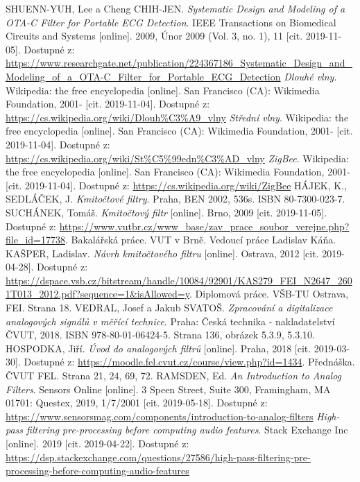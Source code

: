\newpage
\begin{thebibliography}{999}
SHUENN-YUH, Lee a Cheng CHIH-JEN. \textit{Systematic Design and Modeling of a OTA-C Filter for Portable ECG Detection}. IEEE Transactions on Biomedical Circuits and Systems [online]. 2009, Únor 2009 (Vol. 3, no. 1), 11 [cit. 2019-11-05]. Dostupné z: \url{https://www.researchgate.net/publication/224367186_Systematic_Design_and_Modeling_of_a_OTA-C_Filter_for_Portable_ECG_Detection}
\textit{Dlouhé vlny}. Wikipedia: the free encyclopedia [online]. San Francisco (CA): Wikimedia Foundation, 2001- [cit. 2019-11-04]. Dostupné z: \url{https://cs.wikipedia.org/wiki/Dlouh%C3%A9_vlny}
\textit{Střední vlny}. Wikipedia: the free encyclopedia [online]. San Francisco (CA): Wikimedia Foundation, 2001- [cit. 2019-11-04]. Dostupné z: \url{https://cs.wikipedia.org/wiki/St%C5%99edn%C3%AD_vlny}
\textit{ZigBee}. Wikipedia: the free encyclopedia [online]. San Francisco (CA): Wikimedia Foundation, 2001- [cit. 2019-11-04]. Dostupné z: \url{https://cs.wikipedia.org/wiki/ZigBee}
HÁJEK, K., SEDLÁČEK, J. \textit{Kmitočtové  filtry}. Praha, BEN 2002, 536s. ISBN 80-7300-023-7.
SUCHÁNEK, Tomáš. \textit{Kmitočtový filtr} [online]. Brno, 2009 [cit. 2019-11-05]. Dostupné z: \url{https://www.vutbr.cz/www_base/zav_prace_soubor_verejne.php?file_id=17738}. Bakalářská práce. VUT v Brně. Vedoucí práce Ladislav Káňa.
KAŠPER, Ladislav. \textit{Návrh kmitočtového filtru} [online]. Ostrava, 2012 [cit. 2019-04-28]. Dostupné z: \url{https://dspace.vsb.cz/bitstream/handle/10084/92901/KAS279_FEI_N2647_2601T013_2012.pdf?sequence=1&isAllowed=y}. Diplomová práce. VŠB-TU Ostrava, FEI. Strana 18.
VEDRAL, Josef a Jakub SVATOŠ. \textit{Zpracování a digitalizace analogových signálů v měřící technice}. Praha: Česká technika - nakladatelství ČVUT, 2018. ISBN 978-80-01-06424-5. Strana 136, obrázek 5.3.9, 5.3.10.
HOSPODKA, Jiří. \textit{Úvod do analogových filtrů} [online]. Praha, 2018 [cit. 2019-03-30]. Dostupné z: \url{https://moodle.fel.cvut.cz/course/view.php?id=1434}. Přednáška. ČVUT FEL. Strana 21, 24, 69, 72.
\renewcommand{\headrulewidth}{0pt}
\fancyhf{}
RAMSDEN, Ed. \textit{An Introduction to Analog Filters}. Sensors Online [online]. 3 Speen Street, Suite 300, Framingham, MA 01701: Questex, 2019, 1/7/2001 [cit. 2019-05-18]. Dostupné z: \url{https://www.sensorsmag.com/components/introduction-to-analog-filters}
\textit{High-pass filtering pre-processing before computing audio features}. Stack Exchange Inc [online]. 2019 [cit. 2019-04-22]. Dostupné z: \url{https://dsp.stackexchange.com/questions/27586/high-pass-filtering-pre-processing-before-computing-audio-features}

\end{thebibliography}
